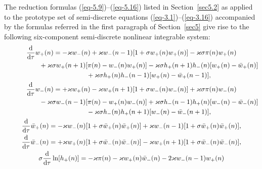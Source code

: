 \documentclass[10pt,a4paper]{amsart}
\numberwithin{equation}{section}
\begin{document}
The reduction formulas (\ref{eq-5.9})--(\ref{eq-5.16}) listed in Section~\ref{sec5.2} as applied to the prototype set of semi-discrete equations (\ref{eq-3.1})--(\ref{eq-3.16})
accompanied by the formulas referred in the first paragraph of Section~\ref{sec5} give rise to the following six-component semi-discrete nonlinear integrable system:
\begin{gather}
	 \frac{\mathrm{d}}{\mathrm{d}\tau}w_{+}(n) = -\varkappa w_{-}(n) + \varkappa w_{-}(n-1)[1+\sigma w_{+}(n)w_{+}(n)] - \varkappa\sigma\pi(n)w_{+}(n)\nonumber\\
\hspace{0.25mm}\hphantom{\frac{\mathrm{d}}{\mathrm{d}\tau}w_{+}(n) =}{}
	 +\varkappa\sigma w_{+}(n+1)[\pi(n)-w_{-}(n)w_{+}(n)] - \varkappa\sigma h_{+}(n+1)h_{-}(n)[w_{+}(n)-\bar{w}_{+}(n)]\nonumber\\
\hspace{0.25mm}\hphantom{\frac{\mathrm{d}}{\mathrm{d}\tau}w_{+}(n) =}{}
	 +\varkappa\sigma h_{+}(n)h_{-}(n-1)[w_{+}(n) - \bar{w}_{+}(n-1)],\label{eq-7.1}
\\
	 \frac{\mathrm{d}}{\mathrm{d}\tau}w_{-}(n) = + \varkappa w_{+}(n) - \varkappa w_{+}(n+1)[1+\sigma w_{-}(n)w_{-}(n)] + \varkappa\sigma\pi(n)w_{-}(n)\nonumber\\
\hspace{0.25mm}\hphantom{\frac{\mathrm{d}}{\mathrm{d}\tau}w_{-}(n) =}{}
	 -\varkappa\sigma w_{-}(n-1)[\pi(n)-w_{+}(n)w_{-}(n)] + \varkappa\sigma h_{-}(n-1)h_{+}(n)[w_{-}(n)-\bar{w}_{-}(n)]\nonumber\\
\hspace{0.25mm}\hphantom{\frac{\mathrm{d}}{\mathrm{d}\tau}w_{-}(n) =}{}
	 -\varkappa\sigma h_{-}(n)h_{+}(n+1)[w_{-}(n) -\bar{w}_{-}(n+1)], \label{eq-7.2}
\\
	 \frac{\mathrm{d}}{\mathrm{d}\tau}\bar{w}_{+}(n) = -\varkappa w_{-}(n)[1+\sigma \bar{w}_{+}(n)\bar{w}_{+}(n)] + \varkappa w_{-}(n-1)[1+\sigma \bar{w}_{+}(n)\bar{w}_{+}(n)], \label{eq-7.3}
\\
	 \frac{\mathrm{d}}{\mathrm{d}\tau}\bar{w}_{-}(n) = +\varkappa w_{+}(n)[1+\sigma \bar{w}_{-}(n)\bar{w}_{-}(n)] - \varkappa w_{+}(n+1)[1+\sigma \bar{w}_{-}(n)\bar{w}_{-}(n)], \label{eq-7.4}
\\
	 \sigma\frac{\mathrm{d}}{\mathrm{d}\tau}\ln[h_{+}(n)] = -\varkappa \pi(n) - \varkappa w_{+}(n)\bar{w}_{-}(n) - 2\varkappa w_{-}(n-1)w_{+}(n) \label{eq-7.5}\\
\hspace{0.25mm}\hphantom{\sigma\frac{\mathrm{d}}{\mathrm{d}\tau}\ln[h_{+}(n)] =}{}

\end{gather}
\end{document}
